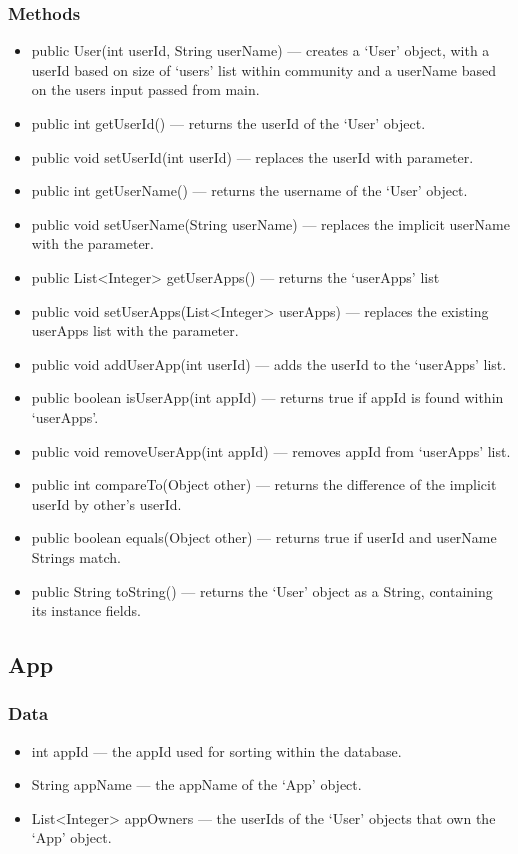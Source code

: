 \documentclass{article}
\begin{document}
\subsubsection{Methods}
\begin{itemize}
    \item{public User(int userId, String userName)}
        --- creates a `User' object, with a userId based on size of `users' list within community and a userName based on the users input passed from main.
    \item{public int getUserId()}
        --- returns the userId of the `User' object.
    \item{public void setUserId(int userId)}
        --- replaces the userId with parameter.
    \item{public int getUserName()}
        --- returns the username of the `User' object.
    \item{public void setUserName(String userName)}
        --- replaces the implicit userName with the parameter.
    \item{public List<Integer> getUserApps()}
        --- returns the `userApps' list
    \item{public void setUserApps(List<Integer> userApps)}
        --- replaces the existing userApps list with the parameter.
    \item{public void addUserApp(int userId)}
        --- adds the userId to the `userApps' list.
    \item{public boolean isUserApp(int appId)}
        --- returns true if appId is found within `userApps'.
    \item{public void removeUserApp(int appId)}
        --- removes appId from `userApps' list.
    \item{public int compareTo(Object other)}
        --- returns the difference of the implicit userId by other's userId.
    \item{public boolean equals(Object other)}
        --- returns true if userId and userName Strings match.
    \item{public String toString()}
        --- returns the `User' object as a String, containing its instance fields.
\end{itemize}
\subsection{App}
\subsubsection{Data}
\begin{itemize}
    \item{int appId}
        --- the appId used for sorting within the database.
    \item{String appName}
        --- the appName of the `App' object.
    \item{List<Integer> appOwners}
        --- the userIds of the `User' objects that own the `App' object.
\end{itemize}
\end{document}
